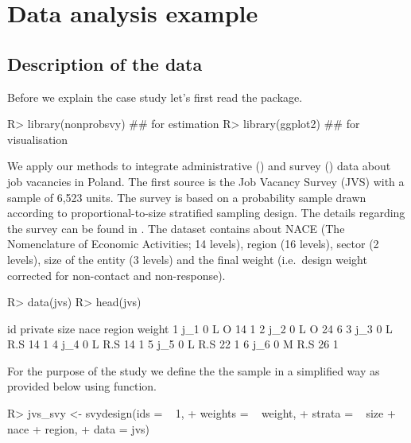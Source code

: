 \documentclass[
]{jss}
\begin{document}
\section{Data analysis example}\label{sec-data-analysis}

\subsection{Description of the data}\label{description-of-the-data}

Before we explain the case study let's first read the package.

\begin{CodeChunk}
\begin{CodeInput}
R> library(nonprobsvy) ## for estimation
R> library(ggplot2) ## for visualisation
\end{CodeInput}
\end{CodeChunk}

We apply our methods to integrate administrative () and
survey () data about job vacancies in Poland. The first source
is the Job Vacancy Survey (JVS) with a sample of 6,523 units. The survey
is based on a probability sample drawn according to proportional-to-size
stratified sampling design. The details regarding the survey can be
found in \cite{jvs2022}. The dataset contains about NACE (The
Nomenclature of Economic Activities; 14 levels), region (16 levels),
sector (2 levels), size of the entity (3 levels) and the final weight
(i.e.~design weight corrected for non-contact and non-response).

\begin{CodeChunk}
\begin{CodeInput}
R> data(jvs)
R> head(jvs)
\end{CodeInput}
\begin{CodeOutput}
   id private size nace region weight
1 j_1       0    L    O     14      1
2 j_2       0    L    O     24      6
3 j_3       0    L  R.S     14      1
4 j_4       0    L  R.S     14      1
5 j_5       0    L  R.S     22      1
6 j_6       0    M  R.S     26      1
\end{CodeOutput}
\end{CodeChunk}

For the purpose of the study we define the the sample in a simplified
way as provided below using  function.

\begin{CodeChunk}
\begin{CodeInput}
R> jvs_svy <- svydesign(ids = ~ 1, 
+                      weights = ~ weight,
+                      strata = ~ size + nace + region,
+                      data = jvs)
\end{CodeInput}
\end{CodeChunk}
\end{document}
